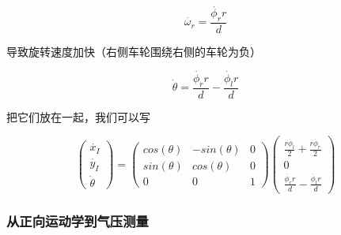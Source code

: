 \begin{equation}
\dot{\omega_r} = \frac{\dot{\phi_r} r}{d}
\end{equation}

导致旋转速度加快（右侧车轮围绕右侧的车轮为负）

\begin{equation}
\dot{\theta}=\frac{\dot{\phi_r} r}{d}-\frac{\dot{\phi_l} r}{d}
\end{equation}

把它们放在一起，我们可以写

\begin{equation}\label{eq:diffwheels}
\left(\begin{array}{c} \dot{x_I}\\\dot{y_I}\\\dot{\theta}\end{array}\right)=\left(\begin{array}{ccc}
cos(\theta) & -sin(\theta) & 0 \\
sin(\theta) & cos(\theta) & 0 \\
0 & 0 & 1\end{array}\right)\left(\begin{array}{c}\frac{r\dot{\phi_l}}{2}+\frac{r\dot{\phi_r}}{2}\\0\\\frac{\dot{\phi_r} r}{d}-\frac{\dot{\phi_l} r}{d}\end{array}\right)
\end{equation}

\subsubsection{从正向运动学到气压测量}

